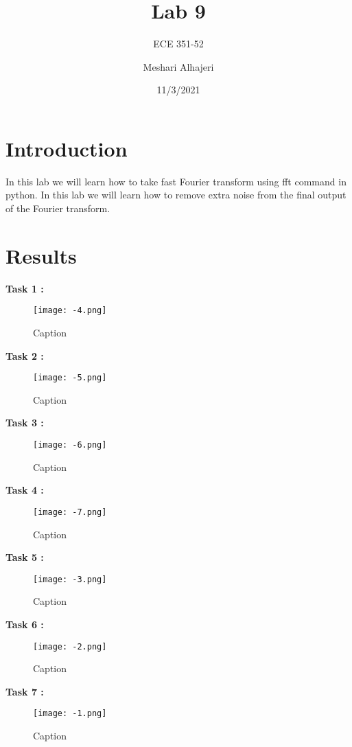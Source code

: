 \documentclass{article}
\title{Lab 9}
\author{ECE 351-52}
\author{Meshari Alhajeri}
\date{11/3/2021}
\begin{document}
\maketitle

\section{Introduction}
In this lab we will learn how to take fast Fourier transform using fft command in python. In this lab we will learn how to remove extra noise from the final output of the Fourier transform.
\section{Results}

\textbf{Task 1 :}
\begin{figure}[H]
\centering
\texttt{[image: -4.png]}
\caption{Caption}
\label{fig:my_label}
\end{figure}

\textbf{Task 2 :}
\begin{figure}[H]
\centering
\texttt{[image: -5.png]}
\caption{Caption}
\label{fig:my_label}
\end{figure}

\textbf{Task 3 :}
\begin{figure}[H]
\centering
\texttt{[image: -6.png]}
\caption{Caption}
\label{fig:my_label}
\end{figure}

\textbf{Task 4 :}
\begin{figure}[H]
\centering
\texttt{[image: -7.png]}
\caption{Caption}
\label{fig:my_label}
\end{figure}

\textbf{Task 5 :}
\begin{figure}[H]
\centering
\texttt{[image: -3.png]}
\caption{Caption}
\label{fig:my_label}
\end{figure}
\textbf{Task 6 :}
\begin{figure}[H]
\centering
\texttt{[image: -2.png]}
\caption{Caption}
\label{fig:my_label}
\end{figure}

\textbf{Task 7 :}
\begin{figure}[H]
\centering
\texttt{[image: -1.png]}
\caption{Caption}
\label{fig:my_label}
\end{figure}
\end{document}
